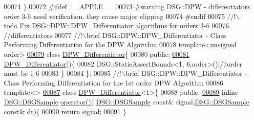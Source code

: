 \begin{DoxyCode}
00071         \}
00072 \textcolor{preprocessor}{#ifdef \_\_APPLE\_\_}
00073 \textcolor{preprocessor}{#warning DSG::DPW - differentiators order 3-6 need verification. they cause major clipping}
00074 \textcolor{preprocessor}{#endif}
00075 \textcolor{comment}{        //!\(\backslash\)todo Fix DSG::DPW::DPW\_Differentiator algorithms for orders 3-6}
00076 \textcolor{comment}{}        \textcolor{comment}{//differentiators}\textcolor{comment}{}
00077 \textcolor{comment}{        //!\(\backslash\)brief DSG::DPW::DPW\_Differentiator - Class Performing Differentiation for the DPW Algorithm}
00078 \textcolor{comment}{}        \textcolor{keyword}{template}<\textcolor{keywordtype}{unsigned} order>
\hypertarget{_d_p_w_8h_source_l00079}{}\hyperlink{class_d_s_g_1_1_d_p_w_1_1_d_p_w___differentiator}{00079}         \textcolor{keyword}{class }\hyperlink{class_d_s_g_1_1_d_p_w_1_1_d_p_w___differentiator}{DPW\_Differentiator}\{
00080         \textcolor{keyword}{public}:
\hypertarget{_d_p_w_8h_source_l00081}{}\hyperlink{class_d_s_g_1_1_d_p_w_1_1_d_p_w___differentiator_acff6769e1c7555fea5e74f1e15bdecd9}{00081}             \hyperlink{class_d_s_g_1_1_d_p_w_1_1_d_p_w___differentiator_acff6769e1c7555fea5e74f1e15bdecd9}{DPW\_Differentiator}()\{
00082                 DSG::StaticAssertBounds<1, 6,order>();\textcolor{comment}{//order must be 1-6}
00083             \}
00084         \};\textcolor{comment}{}
00085 \textcolor{comment}{        //!\(\backslash\)brief DSG::DPW::DPW\_Differentiator - Class Performing Differentiation for the 1st order DPW
       Algorithm}
00086 \textcolor{comment}{}        \textcolor{keyword}{template}<>
\hypertarget{_d_p_w_8h_source_l00087}{}\hyperlink{class_d_s_g_1_1_d_p_w_1_1_d_p_w___differentiator_3_011_01_4}{00087}         \textcolor{keyword}{class }\hyperlink{class_d_s_g_1_1_d_p_w_1_1_d_p_w___differentiator}{DPW\_Differentiator}<1>\{
00088         \textcolor{keyword}{public}:
\hypertarget{_d_p_w_8h_source_l00089}{}\hyperlink{class_d_s_g_1_1_d_p_w_1_1_d_p_w___differentiator_3_011_01_4_a17a8d0b7f400a776fafaa5639b8a0ef2}{00089}             \textcolor{keyword}{inline} \hyperlink{namespace_d_s_g_ac39a94cd27ebcd9c1e7502d0c624894a}{DSG::DSGSample} \hyperlink{class_d_s_g_1_1_d_p_w_1_1_d_p_w___differentiator_3_011_01_4_a17a8d0b7f400a776fafaa5639b8a0ef2}{operator()}(
      \hyperlink{namespace_d_s_g_ac39a94cd27ebcd9c1e7502d0c624894a}{DSG::DSGSample} \textcolor{keyword}{const}& signal,\hyperlink{namespace_d_s_g_ac39a94cd27ebcd9c1e7502d0c624894a}{DSG::DSGSample} \textcolor{keyword}{const}& dt)\{
00090                 \textcolor{keywordflow}{return} signal;
00091             \}

\end{DoxyCode}
